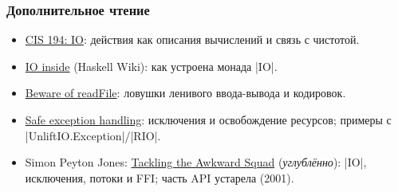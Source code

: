 \documentclass[11pt]{beamer}
\begin{document}
\begin{frame}[fragile]
  \frametitle{Дополнительное чтение}
  \begin{itemize}
    \item \href{https://www.engineering.upenn.edu/~cis1940/spring13/lectures/08-IO.html}{CIS 194: IO}: действия как описания вычислений и связь с чистотой.
    \item \href{https://wiki.haskell.org/IO_inside}{IO inside} (Haskell Wiki): как устроена монада \haskinline|IO|.
    \item \href{https://www.snoyman.com/blog/2016/12/beware-of-readfile/}{Beware of readFile}: ловушки ленивого ввода-вывода и кодировок.
    \item \href{https://academy.fpblock.com/haskell/tutorial/exceptions/}{Safe exception handling}: исключения и освобождение ресурсов; примеры с \haskinline|UnliftIO.Exception|/\haskinline|RIO|.
    \item Simon Peyton Jones: \href{https://www.microsoft.com/en-us/research/publication/tackling-awkward-squad-monadic-inputoutput-concurrency-exceptions-foreign-language-calls-haskell/}{Tackling the Awkward Squad} (\emph{углублённо}): \haskinline|IO|, исключения, потоки и FFI; часть API устарела (2001).
  \end{itemize}
\end{frame}
\end{document}
